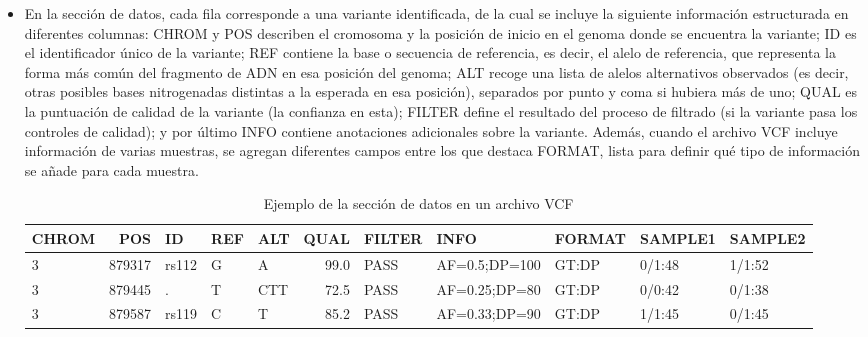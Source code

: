 \documentclass[11pt,spanish,listoffigures,listoftables]{tfgetsinf}
\begin{document}
\begin{itemize}
   \item En la sección de datos, cada fila corresponde a una variante identificada, de la cual se incluye la siguiente información estructurada en diferentes columnas: CHROM y POS describen el cromosoma y la posición de inicio en el genoma donde se encuentra la variante; ID es el identificador único de la variante; REF contiene la base o secuencia de referencia, es decir, el alelo de referencia, que representa la forma más común del fragmento de ADN en esa posición del genoma; ALT recoge una lista de alelos alternativos observados (es decir, otras posibles bases nitrogenadas distintas a la esperada en esa posición), separados por punto y coma si hubiera más de uno; QUAL es la puntuación de calidad de la variante (la confianza en esta); FILTER define el resultado del proceso de filtrado (si la variante pasa los controles de calidad); y por último INFO contiene anotaciones adicionales sobre la variante\cite{EMB}. Además, cuando el archivo \acs{VCF} incluye información de varias muestras, se agregan diferentes campos entre los que destaca FORMAT, lista para definir qué tipo de información se añade para cada muestra. 
      \begin{table}[H]
         \centering
         \caption{Ejemplo de la sección de datos en un archivo VCF}
         \begin{adjustbox}{width=\textwidth}
         \begin{tabular}{|l|r|l|l|l|r|l|l|l|l|l|}
         \hline
         \textbf{CHROM} & \textbf{POS} & \textbf{ID} & \textbf{REF} & \textbf{ALT} & \textbf{QUAL} & \textbf{FILTER} & \textbf{INFO} & \textbf{FORMAT} & \textbf{SAMPLE1} & \textbf{SAMPLE2} \\
         \hline
         3 & 879317 & rs112 & G & A & 99.0 & PASS & AF=0.5;DP=100 & GT:DP & 0/1:48 & 1/1:52 \\
         3 & 879445 & . & T & CTT & 72.5 & PASS & AF=0.25;DP=80 & GT:DP & 0/0:42 & 0/1:38 \\
         3 & 879587 & rs119 & C & T & 85.2 & PASS & AF=0.33;DP=90 & GT:DP & 1/1:45 & 0/1:45 \\
         \hline
         \end{tabular}
         \end{adjustbox}
         \label{tabla:ejemploVCF}
      \end{table}
      
      
      
\end{itemize}
\end{document}
